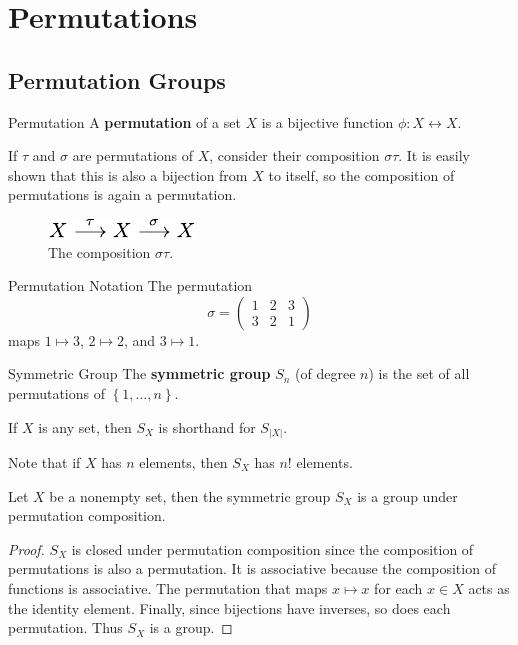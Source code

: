 \documentclass[10pt]{report}
\begin{document}

\chapter{Permutations}


\section{Permutation Groups}

\begin{defn}{Permutation}{}
A \textbf{permutation} of a set $X$ is a bijective function $\phi:X \leftrightarrow X$.
\end{defn}

If $\tau$ and $\sigma$ are permutations of $X$, consider their composition $\sigma \tau$. It is easily shown that this is also a bijection from $X$ to itself, so the composition of permutations is again a permutation.

\begin{figure}[H]
	\centering
	\includegraphics[scale=1.2]{fig/permutation-composition.pdf}
	\caption{The composition $\sigma \tau$.}
\end{figure}

\begin{note}{Permutation Notation}{}
The permutation
\[
\sigma =
\begin{pmatrix}
	1 & 2 & 3 \\
	3 & 2 & 1
\end{pmatrix}
\] maps $1 \mapsto 3$, $2 \mapsto 2$, and $3 \mapsto 1$.
\end{note}

\begin{defn}{Symmetric Group}{}
The \textbf{symmetric group} $S_n$ (of degree $n$) is the set of all permutations of $\left\{ 1, \dots, n \right\}$.

If $X$ is any set, then $S_X$ is shorthand for $S_{|X|}$.
\end{defn}

Note that if $X$ has $n$ elements, then $S_X$ has $n!$ elements.

\begin{thrm}{}{}
Let $X$ be a nonempty set, then the symmetric group $S_X$ is a group under permutation composition.
\end{thrm}
\begin{proof}
	$S_X$ is closed under permutation composition since the composition of permutations is also a permutation. It is associative because the composition of functions is associative. The permutation that maps $x \mapsto x$ for each $x \in X$ acts as the identity element. Finally, since bijections have inverses, so does each permutation. Thus $S_X$ is a group.
\end{proof}
\end{document}
